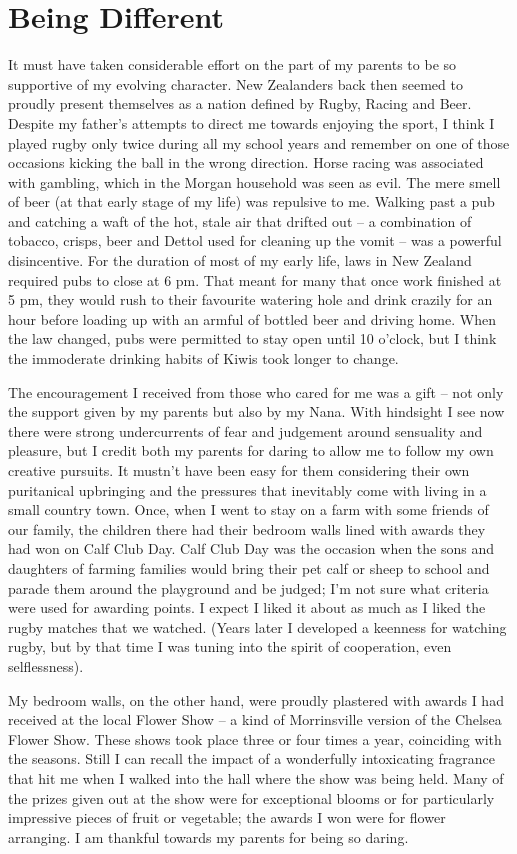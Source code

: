 \chapter{Being Different}

It must have taken considerable effort on the part of my parents to be
so supportive of my evolving character. New Zealanders back then seemed
to proudly present themselves as a nation defined by Rugby, Racing and
Beer. Despite my father's attempts to direct me towards enjoying the
sport, I think I played rugby only twice during all my school years and
remember on one of those occasions kicking the ball in the wrong
direction. Horse racing was associated with gambling, which in the
Morgan household was seen as evil. The mere smell of beer (at that early
stage of my life) was repulsive to me. Walking past a pub and catching a
waft of the hot, stale air that drifted out -- a combination of tobacco,
crisps, beer and Dettol used for cleaning up the vomit -- was a powerful
disincentive. For the duration of most of my early life, laws in New
Zealand required pubs to close at 6 pm. That meant for many that once
work finished at 5 pm, they would rush to their favourite watering hole
and drink crazily for an hour before loading up with an armful of
bottled beer and driving home. When the law changed, pubs were permitted
to stay open until 10 o'clock, but I think the immoderate drinking
habits of Kiwis took longer to change.

The encouragement I received from those who cared for me was a gift --
not only the support given by my parents but also by my Nana. With
hindsight I see now there were strong undercurrents of fear and
judgement around sensuality and pleasure, but I credit both my parents
for daring to allow me to follow my own creative pursuits. It mustn't
have been easy for them considering their own puritanical upbringing and
the pressures that inevitably come with living in a small country town.
Once, when I went to stay on a farm with some friends of our family, the
children there had their bedroom walls lined with awards they had won on
Calf Club Day. Calf Club Day was the occasion when the sons and
daughters of farming families would bring their pet calf or sheep to
school and parade them around the playground and be judged; I'm not sure
what criteria were used for awarding points. I expect I liked it about
as much as I liked the rugby matches that we watched. (Years later I
developed a keenness for watching rugby, but by that time I was tuning
into the spirit of cooperation, even selflessness).

My bedroom walls, on the other hand, were proudly plastered with awards
I had received at the local Flower Show -- a kind of Morrinsville
version of the Chelsea Flower Show. These shows took place three or four
times a year, coinciding with the seasons. Still I can recall the impact
of a wonderfully intoxicating fragrance that hit me when I walked into
the hall where the show was being held. Many of the prizes given out at
the show were for exceptional blooms or for particularly impressive
pieces of fruit or vegetable; the awards I won were for flower
arranging. I am thankful towards my parents for being so daring.

